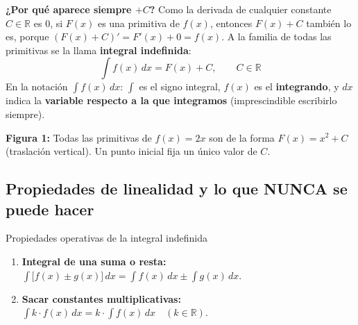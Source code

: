 \documentclass[10pt,a4paper]{article}
\begin{document}
\textbf{¿Por qué aparece siempre $+C$?} Como la derivada de cualquier constante $C \in \mathbb{R}$ es $0$, si $F(x)$ es una primitiva de $f(x)$, entonces $F(x) + C$ también lo es, porque $(F(x) + C)' = F'(x) + 0 = f(x)$. A la familia de todas las primitivas se la llama \textbf{integral indefinida}:
$$\int f(x)\,dx = F(x) + C, \qquad C \in \mathbb{R}$$
En la notación $\int f(x)\,dx$: $\int$ es el signo integral, $f(x)$ es el \textbf{integrando}, y $dx$ indica la \textbf{variable respecto a la que integramos} (imprescindible escribirlo siempre).

\begin{center}
\par\vspace{-2pt}
{\footnotesize \textbf{Figura 1:} Todas las primitivas de $f(x)=2x$ son de la forma $F(x)=x^2+C$ (traslación vertical). Un punto inicial fija un único valor de $C$.}
\end{center}

\subsection{Propiedades de linealidad y lo que NUNCA se puede hacer}

\begin{formulabox}{Propiedades operativas de la integral indefinida}
\begin{enumerate}\itemsep 2pt
  \item \textbf{Integral de una suma o resta:} $\displaystyle \int \big[f(x) \pm g(x)\big]\,dx = \int f(x)\,dx \pm \int g(x)\,dx$.
  \item \textbf{Sacar constantes multiplicativas:} $\displaystyle \int k \cdot f(x)\,dx = k \cdot \int f(x)\,dx \quad (k \in \mathbb{R})$.
\end{enumerate}
\end{formulabox}
\end{document}
